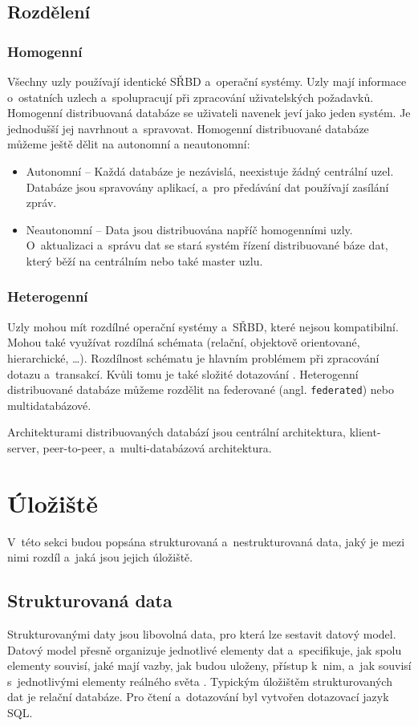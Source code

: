 \subsection{Rozdělení}
\subsubsection{Homogenní}
Všechny uzly používají identické SŘBD a~operační systémy. Uzly mají informace o~ostatních uzlech a~spolupracují při zpracování uživatelských požadavků. Homogenní distribuovaná databáze se uživateli navenek jeví jako jeden systém. Je jednodušší jej navrhnout a~spravovat. Homogenní distribuované databáze můžeme ještě dělit na autonomní a neautonomní:

\begin{itemize}
    \item Autonomní -- Každá databáze je nezávislá, neexistuje žádný centrální uzel. Databáze jsou spravovány aplikací, a~pro předávání dat používají zasílání zpráv.
    
    \item Neautonomní -- Data jsou distribuována napříč homogenními uzly. O~aktualizaci a~správu dat se stará systém řízení distribuované báze dat, který běží na centrálním nebo také master uzlu.
\end{itemize}

\subsubsection{Heterogenní}
Uzly mohou mít rozdílné operační systémy a~SŘBD, které nejsou kompatibilní. Mohou také využívat rozdílná schémata (relační, objektově orientované, hierarchické, \ldots). Rozdílnost schématu je hlavním problémem při zpracování dotazu a~transakcí. Kvůli tomu je také složité dotazování \cite{wikiDBMS}. Heterogenní distribuované databáze můžeme rozdělit na federované (angl. \texttt{federated}) nebo multidatabázové.

Architekturami distribuovaných databází jsou centrální architektura, klient-server, peer-to-peer, a~multi-databázová architektura.

\section{Úložiště} \label{storage}
V~této sekci budou popsána strukturovaná a~nestrukturovaná data, jaký je mezi nimi rozdíl a~jaká jsou jejich úložiště.

\subsection{Strukturovaná data}
Strukturovanými daty jsou libovolná data, pro která lze sestavit datový model. Datový model přesně organizuje jednotlivé elementy dat a~specifikuje, jak spolu elementy souvisí, jaké mají vazby, jak budou uloženy, přístup k~nim, a~jak souvisí s~jednotlivými elementy reálného světa \cite{structData}. Typickým úložištěm strukturovaných dat je relační databáze. Pro čtení a~dotazování byl vytvořen dotazovací jazyk SQL.

